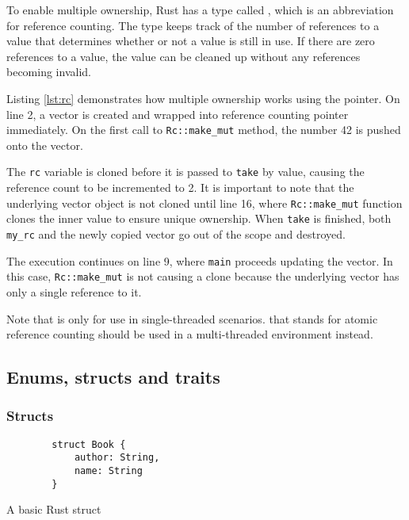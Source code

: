 To enable multiple ownership, Rust has a type called , which is an abbreviation for reference counting. The  type keeps track of the number of references to a value that determines whether or not a value is still in use. If there are zero references to a value, the value can be cleaned up without any references becoming invalid.

Listing \ref{lst:rc} demonstrates how multiple ownership works using the  pointer. On line 2, a vector is created and wrapped into reference counting pointer immediately. On the first call to \texttt{Rc::make_mut} method, the number 42 is pushed onto the vector.

The \texttt{rc} variable is cloned before it is passed to \texttt{take} by value, causing the reference count to be incremented to 2. It is important to note that the underlying vector object is not cloned until line 16, where \texttt{Rc::make_mut} function clones the inner value to ensure unique ownership. When \texttt{take} is finished, both \texttt{my_rc} and the newly copied vector go out of the scope and destroyed.

The execution continues on line 9, where \texttt{main} proceeds updating the vector. In this case, \texttt{Rc::make_mut} is not causing a clone because the underlying vector has only a single reference to it.

Note that  is only for use in single-threaded scenarios.  that stands for atomic reference counting should be used in a multi-threaded environment instead.

\subsection{Enums, structs and traits}

\subsubsection*{Structs}

\begin{listing}[!htbp]

    \centering
    \begin{verbatim}
        struct Book {
            author: String,
            name: String
        }
    \end{verbatim}

    \caption{A basic Rust struct}
    \label{lst:struct}
\end{listing}

